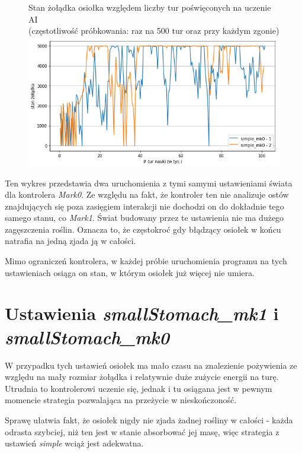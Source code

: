\begin{figure}[H]
    \centering    
    Stan żołądka osiołka względem liczby tur poświęconych na uczenie AI
    \\(częstotliwość próbkowania: raz na 500 tur oraz przy każdym zgonie)
    \includegraphics[scale=0.6]{Chapters/simple_mk0_hunger}
\end{figure}

Ten wykres przedstawia dwa uruchomienia z tymi samymi ustawieniami świata dla kontrolera \textit{Mark0}. Ze względu na fakt, że kontroler ten nie analizuje ostów znajdujących się poza zasięgiem interakcji nie dochodzi on do dokładnie tego samego stanu, co \textit{Mark1}. Świat budowany przez te ustawienia nie ma dużego zagęszczenia roślin. Oznacza to, że częstokroć gdy błądzący osiołek w końcu natrafia na jedną zjada ją w całości.

Mimo ograniczeń kontrolera, w każdej próbie uruchomienia programu na tych ustawieniach osiąga on stan, w którym osiołek już więcej nie umiera.

\section{Ustawienia \textit{smallStomach\_mk1} i \textit{smallStomach\_mk0}}
W przypadku tych  ustawień osiołek ma mało czasu na znalezienie pożywienia ze względu na mały rozmiar żołądka i relatywnie duże zużycie energii na turę. Utrudnia to kontrolerowi uczenie się, jednak i tu osiągana jest w pewnym momencie strategia pozwalająca na przeżycie w nieskończoność.

Sprawę ułatwia fakt, że osiołek nigdy nie zjada żadnej rośliny w całości - każda odrasta szybciej, niż ten jest w stanie absorbować jej masę, więc strategia z ustawień \textit{simple} wciąż jest adekwatna.

